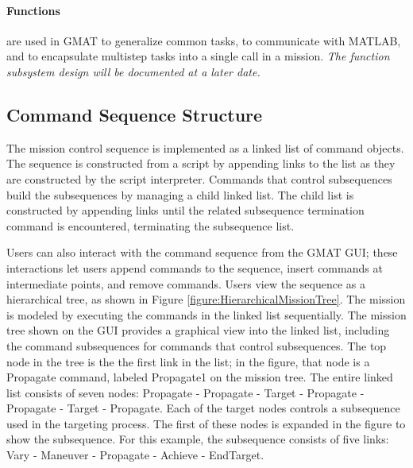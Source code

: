 \paragraph{Functions} are used in GMAT to generalize common tasks, to communicate with MATLAB, and
to encapsulate multistep tasks into a single call in a mission.  \textit{The function subsystem
design will be documented at a later date.}

\subsection{Command Sequence Structure}

The mission control sequence is implemented as a linked list of command objects.  The sequence is
constructed from a script by appending links to the list as they are constructed by the script
interpreter.  Commands that control subsequences build the subsequences by managing a child linked
list.  The child list is constructed by appending links until the related subsequence termination
command is encountered, terminating the subsequence list.

Users can also interact with the command sequence from the GMAT GUI; these interactions let users
append commands to the sequence, insert commands at intermediate points, and remove commands.  Users
view the sequence as a hierarchical tree, as shown in Figure \ref{figure:HierarchicalMissionTree}.
The mission is modeled by executing the commands in the linked list sequentially.  The mission tree
shown on the GUI provides a graphical view into the linked list, including the command subsequences
for commands that control subsequences.  The top node in the tree is the the first link in the list;
in the figure, that node is a Propagate command, labeled Propagate1 on the mission tree.  The entire
linked list consists of seven nodes: Propagate - Propagate - Target - Propagate - Propagate - Target
- Propagate.  Each of the target nodes controls a subsequence used in the targeting process.  The
first of these nodes is expanded in the figure to show the subsequence.  For this example, the
subsequence consists of five links: Vary - Maneuver - Propagate - Achieve - EndTarget.

